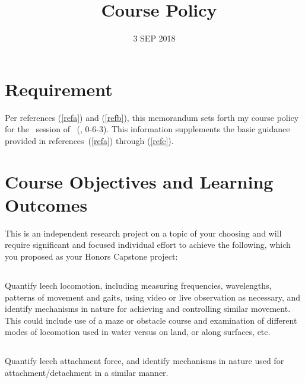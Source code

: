 \documentclass[10pt,courier]{navymemo}
\author{\usnaInstructorShort}
\title{\usnaCourseNumber\ Course Policy}
\date{3 SEP 2018}
\begin{document}
\makedateblock{}

\MEMORANDUM{}

\begin{navyletterheader}
\navyskip{}%

\navysubjline{}
\navyskip{}%
\end{navyletterheader}

\section{Requirement}
Per references (\ref{refa}) and (\ref{refb}), this memorandum sets forth my course policy for the \courseTerm\ session of \usnaCourseNumber\ (\usnaCourseName, 0-6-3).  This information supplements the basic guidance provided in references~(\ref{refa}) through (\ref{refe}). 

\section{Course Objectives and Learning Outcomes}  This is an independent research project on a topic of your choosing and will require significant and focused individual effort to achieve the following, which you proposed as your Honors Capstone project:
\subsection{} Quantify leech locomotion, including measuring frequencies, wavelengths, patterns of movement and gaits, using video or live observation as necessary, and identify mechanisms in nature for achieving and controlling similar movement. This could include use of a maze or obstacle course and examination of different modes of locomotion used in water versus on land, or along surfaces, etc. 
\subsection{} Quantify leech attachment force, and identify mechanisms in nature used for attachment/detachment in a similar manner.  
\end{document}
